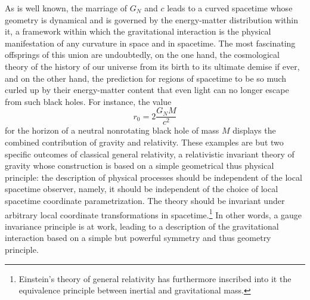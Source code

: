 \documentclass[a4paper,11pt]{article}
\begin{document}
As is well known, the marriage of $G_N$ and $c$ leads to a curved
spacetime whose geometry is dynamical and is governed by the energy-matter
distribution within it, a framework within which the gravitational 
interaction is the physical manifestation of any curvature in space and 
in spacetime. The most fascinating offsprings of this union are undoubtedly,
on the one hand, the cosmological theory of the history of our universe from 
its birth to its ultimate demise if ever, and on the other hand,
the prediction for regions of spacetime to be so much curled up by their
energy-matter content that even light can no longer escape from such
black holes. For instance, the value
\begin{equation}
r_0=2\frac{G_NM}{c^2}
\end{equation}
for the horizon of a neutral nonrotating black hole of mass $M$
displays the combined contribution of gravity and relativity.
These examples are but two specific outcomes of classical general relativity,
a relativistic invariant theory of gravity whose construction is based
on a simple geometrical thus physical principle: the description
of physical processes should be independent of the local spacetime
observer, namely, it should be independent of the choice
of local spacetime coordinate parametrization. The theory should be
invariant under arbitrary local coordinate transformations in
spacetime.\footnote{Einstein's theory of general relativity has furthermore 
inscribed into it the equivalence principle between inertial and 
gravitational mass.}
In other words, a gauge invariance principle is at work, leading
to a description of the gravitational interaction based on
a simple but powerful symmetry and thus geometry principle.
\end{document}
